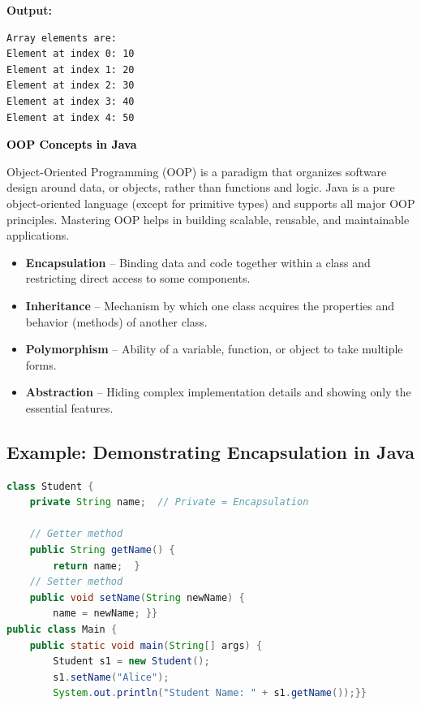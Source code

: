 \documentclass{article}
\begin{document}
\noindent\textbf{Output:}
\begin{verbatim}
Array elements are:
Element at index 0: 10
Element at index 1: 20
Element at index 2: 30
Element at index 3: 40
Element at index 4: 50
\end{verbatim}


\newpage
\begin{center}
    \Huge\bfseries \textcolor{black}{OOP Concepts in Java}
\end{center}
\vspace{0.5cm}

\noindent
Object-Oriented Programming (OOP) is a paradigm that organizes software design around data, or objects, rather than functions and logic. Java is a pure object-oriented language (except for primitive types) and supports all major OOP principles. Mastering OOP helps in building scalable, reusable, and maintainable applications.

\vspace{0.5cm}

\begin{tcolorbox}[colback=black!5!white,colframe=black,title=\textbf{Four Pillars of OOP in Java}]
\begin{itemize}[leftmargin=2em]
    \item \textbf{Encapsulation} – Binding data and code together within a class and restricting direct access to some components.
    \item \textbf{Inheritance} – Mechanism by which one class acquires the properties and behavior (methods) of another class.
    \item \textbf{Polymorphism} – Ability of a variable, function, or object to take multiple forms.
    \item \textbf{Abstraction} – Hiding complex implementation details and showing only the essential features.
\end{itemize}
\end{tcolorbox}

\vspace{0.5cm}

\subsection*{Example: Demonstrating Encapsulation in Java}
\begin{lstlisting}[language=Java,caption=Java Program to Demonstrate Encapsulation,label=lst:oopEncapsulation]
class Student {
    private String name;  // Private = Encapsulation

    // Getter method
    public String getName() {
        return name;  }
    // Setter method
    public void setName(String newName) {
        name = newName; }}
public class Main {
    public static void main(String[] args) {
        Student s1 = new Student();
        s1.setName("Alice");
        System.out.println("Student Name: " + s1.getName());}}
\end{lstlisting}
\end{document}
